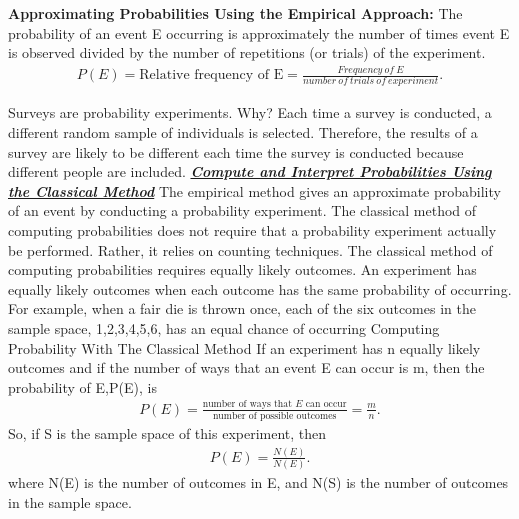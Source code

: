 \documentclass{report}
\begin{document}
    \bigbreak \noindent 
    \textbf{Approximating Probabilities Using the Empirical Approach:}
    \bigbreak \noindent 
    The probability of an event E occurring is approximately the number of times event E is observed divided by the number of repetitions (or trials) of the experiment.
    \begin{align*}
        P(E) = \text{Relative frequency of E} = \frac{Frequency\ of\ E}{number\ of\ trials\ of\ experiment}
    .\end{align*}

    \bigbreak \noindent 

    \bigbreak \noindent 
    Surveys are probability experiments. Why? Each time a survey is conducted, a different random sample of individuals is selected. Therefore, the results of a survey are likely to be different each time the survey is conducted because different people are included.
    \pagebreak \bigbreak \noindent
    \textbf{\textit{\underline{Compute and Interpret Probabilities Using the Classical Method}}}
    \bigbreak \noindent 
    The empirical method gives an approximate probability of an event by conducting a probability experiment. The classical method of computing probabilities does not require that a probability experiment actually be performed. Rather, it relies on counting techniques.
    \bigbreak \noindent 
    The classical method of computing probabilities requires equally likely outcomes. An experiment has equally likely outcomes when each outcome has the same probability of occurring. For example, when a fair die is thrown once, each of the six outcomes in the sample space, {1,2,3,4,5,6}, has an equal chance of occurring
     Computing Probability With The Classical Method
     \bigbreak \noindent 
     If an experiment has n equally likely outcomes and if the number of ways that an event E can occur is m, then the probability of E,P(E), is
    \begin{align*}
        P(E) = \frac{\text{number of ways that $E$ can occur}}{\text{number of possible outcomes}} = \frac{m}{n}
    .\end{align*}
    \bigbreak \noindent 
         So, if S is the sample space of this experiment, then
            \begin{align*}
                P(E) = \frac{N(E)}{N(E)}
            .\end{align*}
    where N(E) is the number of outcomes in E, and N(S) is the number of outcomes in the sample space.
\end{document}
